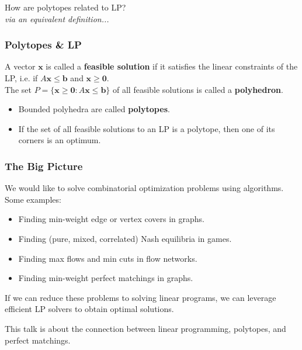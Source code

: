 \begin{frame}
\begin{center}
	{\Large How are polytopes related to LP?} \\
	\vspace{0.3cm}
	\pause
	\emph{via an equivalent definition...} 
\end{center}
\end{frame}

\begin{frame}
\frametitle{Polytopes \& LP}
A vector \( \mathbf{x} \) is called a \textbf{feasible solution} if it satisfies the linear constraints of the LP, i.e. if \( A \mathbf{x} \leq \mathbf{b} \) and \( \mathbf{x} \geq \mathbf{0} \).\\
\pause
\vspace{0.3cm} The set \( P = \{ \mathbf{x} \geq \mathbf{0} : A\mathbf{x} \leq \mathbf{b} \}  \) of all feasible solutions is called a \textbf{polyhedron}. 
\begin{itemize}
	\item<3-> Bounded polyhedra are called \textbf{polytopes}.
	\item<4-> If the set of all feasible solutions to an LP is a polytope, then one of its corners is an optimum.
\end{itemize}
\end{frame}

\begin{frame}
\frametitle{The Big Picture}
We would like to solve combinatorial optimization problems using algorithms.\\
\pause
\vspace{0.3cm}
Some examples:
\pause
\begin{itemize}
	\item Finding min-weight edge or vertex covers in graphs.\pause
	\item Finding (pure, mixed, correlated) Nash equilibria in games. \pause
	\item Finding max flows and min cuts in flow networks. \pause
	\item Finding min-weight perfect matchings in graphs. \pause
\end{itemize}
\vspace{0.3cm}
If we can reduce these problems to solving linear programs, we can leverage efficient LP solvers to obtain optimal solutions.
\end{frame}

\begin{frame}
\begin{center}
\Large This talk is about the connection between linear programming, polytopes, and perfect matchings.
\end{center}
\end{frame}

